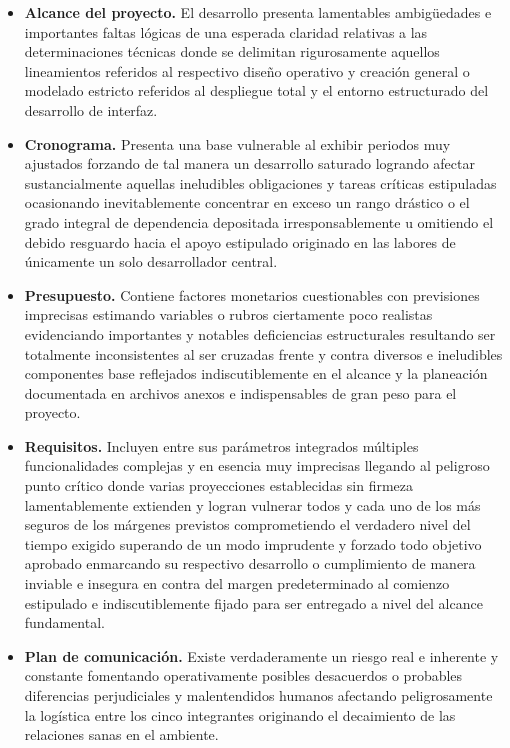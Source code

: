 \documentclass[11pt,spanish]{article}
\begin{document}
\begin{itemize}
    \item \textbf{Alcance del proyecto.} El desarrollo presenta lamentables ambigüedades e importantes faltas lógicas de una esperada claridad relativas a las determinaciones técnicas donde se delimitan rigurosamente aquellos lineamientos referidos al respectivo diseño operativo y creación general o modelado estricto referidos al despliegue total y el entorno estructurado del desarrollo de interfaz.
    \item \textbf{Cronograma.} Presenta una base vulnerable al exhibir periodos muy ajustados forzando de tal manera un desarrollo saturado logrando afectar sustancialmente aquellas ineludibles obligaciones y tareas críticas estipuladas ocasionando inevitablemente concentrar en exceso un rango drástico o el grado integral de dependencia depositada irresponsablemente u omitiendo el debido resguardo hacia el apoyo estipulado originado en las labores de únicamente un solo desarrollador central.
    \item \textbf{Presupuesto.} Contiene factores monetarios cuestionables con previsiones imprecisas estimando variables o rubros ciertamente poco realistas evidenciando importantes y notables deficiencias estructurales resultando ser totalmente inconsistentes al ser cruzadas frente y contra diversos e ineludibles componentes base reflejados indiscutiblemente en el alcance y la planeación documentada en archivos anexos e indispensables de gran peso para el proyecto.
    \item \textbf{Requisitos.} Incluyen entre sus parámetros integrados múltiples funcionalidades complejas y en esencia muy imprecisas llegando al peligroso punto crítico donde varias proyecciones establecidas sin firmeza lamentablemente extienden y logran vulnerar todos y cada uno de los más seguros de los márgenes previstos comprometiendo el verdadero nivel del tiempo exigido superando de un modo imprudente y forzado todo objetivo aprobado enmarcando su respectivo desarrollo o cumplimiento de manera inviable e insegura en contra del margen predeterminado al comienzo estipulado e indiscutiblemente fijado para ser entregado a nivel del alcance fundamental.
    \item \textbf{Plan de comunicación.} Existe verdaderamente un riesgo real e inherente y constante fomentando operativamente posibles desacuerdos o probables diferencias perjudiciales y malentendidos humanos afectando peligrosamente la logística entre los cinco integrantes originando el decaimiento de las relaciones sanas en el ambiente.
\end{itemize}
\end{document}
